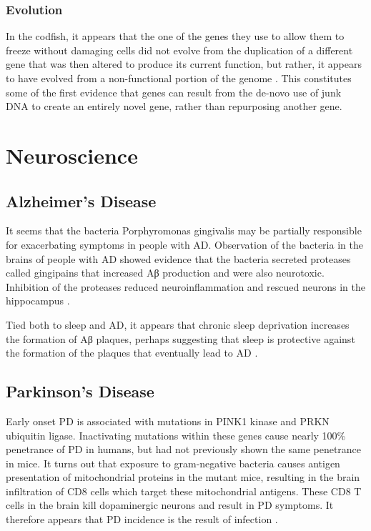 \documentclass[]{book}
\begin{document}
\hypertarget{evolution}{%
\subsection{Evolution}\label{evolution}}

In the codfish, it appears that the one of the genes they use to allow them to freeze without damaging cells did not evolve from the duplication of a different gene that was then altered to produce its current function, but rather, it appears to have evolved from a non-functional portion of the genome \citep{baalsrud2017novo}. This constitutes some of the first evidence that genes can result from the de-novo use of junk DNA to create an entirely novel gene, rather than repurposing
another gene.

\hypertarget{neurosci}{%
\chapter{Neuroscience}\label{neurosci}}

\hypertarget{alzheimers-disease}{%
\section{Alzheimer's Disease}\label{alzheimers-disease}}

It seems that the bacteria Porphyromonas gingivalis may be partially responsible for exacerbating symptoms in people with AD. Observation of the bacteria in the brains of people with AD showed evidence that the bacteria secreted proteases called gingipains that increased Aβ production and were also neurotoxic. Inhibition of the proteases reduced neuroinflammation and rescued neurons in the hippocampus \citep{dominy2019porphyromonas}.

Tied both to sleep and AD, it appears that chronic sleep deprivation increases the formation of Aβ plaques, perhaps suggesting that sleep is protective against the formation of the plaques that eventually lead to AD \citep{Holth2019-cd}.

\hypertarget{parkinsons-disease}{%
\section{Parkinson's Disease}\label{parkinsons-disease}}

Early onset PD is associated with mutations in PINK1 kinase and PRKN ubiquitin ligase. Inactivating mutations within these genes cause nearly 100\% penetrance of PD in humans, but had not previously shown the same penetrance in mice. It turns out that exposure to gram-negative bacteria causes antigen presentation of mitochondrial proteins in the mutant mice, resulting in the brain infiltration of CD8 cells which target these mitochondrial antigens. These CD8 T cells in the brain kill dopaminergic neurons and result in PD symptoms. It therefore appears that PD incidence is the result of infection \citep{matheoud2019intestinal}.
\end{document}
